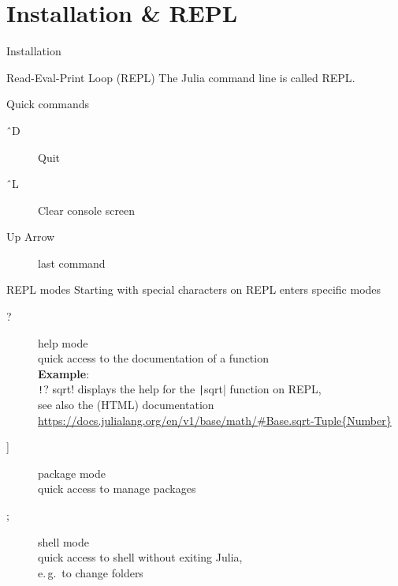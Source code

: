 \documentclass[aspectratio=169, handout]{beamer}
\begin{document}
    \section{Installation \& REPL}
    \begin{frame}{Installation}
    \end{frame}
    \begin{frame}{Read-Eval-Print Loop (REPL)}
        The Julia command line is called \alert{REPL}.

        Quick commands
        \begin{description}
            \item[\^\ D] Quit
            \item[\^\ L] Clear console screen
            \item[Up Arrow] last command
        \end{description}
    \end{frame}
    \begin{frame}{REPL modes}
        Starting with special characters on REPL enters specific modes
        \begin{description}
            \item[?] help mode\\
            quick access to the documentation of a function
            \\[.5\baselineskip]
            \textbf{Example}:\\
            \texttt!? sqrt! displays the help for the \texttt|sqrt| function on REPL,
            \\
            see also the (HTML) documentation\\
            {\footnotesize\url{https://docs.julialang.org/en/v1/base/math/\#Base.sqrt-Tuple{Number}}}
            \\[-.66\baselineskip]
            \item[{]}] package mode
            \\ quick access to manage packages
            \item[;] shell mode
            \\ quick access to shell without exiting Julia,\\
            e.\,g.\ to change folders
        \end{description}
    \end{frame}
\end{document}
